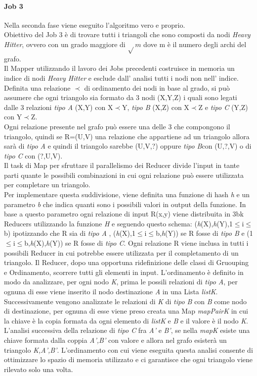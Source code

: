 \documentclass[paper=a4, fontsize=11pt]{scrartcl}	%
\numberwithin{equation}{section}															%
\numberwithin{figure}{section}																%
\numberwithin{table}{section}																%
\begin{document}
\paragraph{Job 3}
Nella seconda fase viene eseguito l'algoritmo vero e proprio.\\
Obiettivo del Job 3 è di trovare tutti i triangoli che sono composti da nodi \textit{Heavy Hitter}, ovvero con un grado maggiore di $\sqrt{} m$ dove m è il numero degli archi del grafo.\\
Il Mapper utilizzando il lavoro dei Jobs precedenti costruisce in memoria un indice di nodi \textit{Heavy Hitter} e esclude dall' analisi tutti i nodi non nell' indice.\\
Definita una relazione $\prec$ di ordinamento dei nodi in base al grado, si può assumere che ogni triangolo sia formato da 3 nodi (X,Y,Z) i quali sono legati dalle 3 relazioni \textit{tipo A} (X,Y) con X$\prec$Y, \textit{tipo B} (X,Z) con X$\prec$Z e \textit{tipo C} (Y,Z) con Y$\prec$Z.\\
Ogni relazione presente nel grafo può essere una delle 3 che compongono il triangolo, quindi se R=(U,V) una relazione che appartiene ad un triangolo allora sarà di \textit{tipo A} e quindi  il triangolo sarebbe (U,V,?) oppure \textit{tipo B}con (U,?,V) o di \textit{tipo C} con (?,U,V).\\
Il task di Map per sfruttare il parallelismo dei Reducer divide l'input in tante parti quante le possibili combinazioni in cui ogni relazione può essere utilizzata per completare un triangolo.\\
Per implementare questa suddivisione, viene definita una funzione di hash \textit{h} e un parametro \textit{b} che indica quanti sono i possibili valori in output della funzione. In base a questo parametro ogni relazione di input R(x,y) viene distribuita in 3bk Reducers utilizzando la funzione \textit{H} e seguendo questo schema: (\textit{h}(X),\textit{h}(Y),1$\leq$i$\leq$b) ipotizzando che R sia di \textit{tipo A} , (\textit{h}(X),1$\leq$i$\leq$b,\textit{h}(Y)) se R fosse di \textit{tipo B} e (1$\leq$i$\leq$b,\textit{h}(X),\textit{h}(Y)) se R fosse di \textit{tipo C}. Ogni relazione R viene inclusa in tutti i possibili Reducer in cui potrebbe essere utilizzata per il completamento di un triangolo.
Il Reducer, dopo una opportuna ridefinizione delle classi di Gruouping e Ordinamento, scorrere tutti gli elementi in input. L'ordinamento è definito in modo da analizzare, per ogni nodo \textit{K}, prima le possili relazioni di \textit{tipo A}, per ognuna di esse viene inserito il nodo destinazione \textit{A} in una Lista \textit{listK}. Successivamente vengono analizzate le relazioni di \textit{K} di \textit{tipo B} con \textit{B} come nodo di destinazione, per ognuna di esse viene preso creata una Map \textit{mapPairK} in cui la chiave è la copia formata da ogni elemento di \textit{listK} e \textit{B} e il valore è il nodo \textit{K}.
L'analisi successiva della relazione di \textit{tipo C} fra \textit{A'} e \textit{B'}, se nella \textit{mapK} esiste una chiave formata dalla coppia  \textit{A',B'} con valore e allora nel grafo esisterà un triangolo \textit{K,A',B'}.
L'ordinamento con cui viene eseguita questa analisi consente di ottimizzare lo spazio di memoria utilizzato e ci garantisce che ogni triangolo viene rilevato solo una volta.
\end{document}
